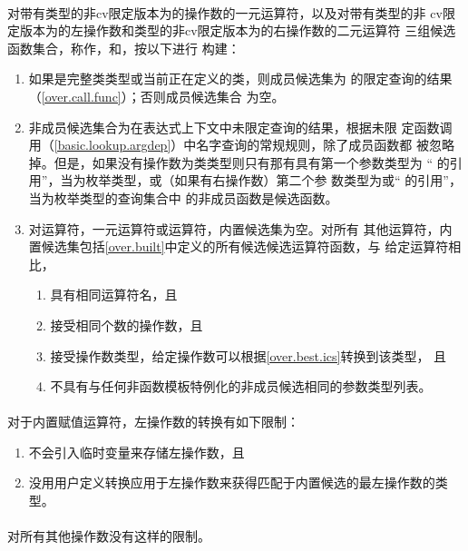 \paragraph{}
对带有类型的非cv限定版本为的操作数的一元运算符，以及对带有类型的非
cv限定版本为的左操作数和类型的非cv限定版本为的右操作数的二元运算符
三组候选函数集合，称作，和，按以下进行
构建：
\begin{enumerate}
  \item{如果是完整类类型或当前正在定义的类，则成员候选集为
    的限定查询的结果（\ref{over.call.func}）；否则成员候选集合
    为空。}
  \item{非成员候选集合为在表达式上下文中未限定查询的结果，根据未限
    定函数调用（\ref{basic.lookup.argdep}）中名字查询的常规规则，除了成员函数都
    被忽略掉。但是，如果没有操作数为类类型则只有那有具有第一个参数类型为
    `` 的引用''，当为枚举类型，或（如果有右操作数）第二个参
    数类型为或`` 的引用''，当为枚举类型的查询集合中
    的非成员函数是候选函数。}
  \item{对运算符\tm{,}，一元运算符\tm{\&}或运算符\tm{->}，内置候选集为空。对所有
    其他运算符，内置候选集包括\ref{over.built}中定义的所有候选候选运算符函数，与
    给定运算符相比，
    \begin{enumerate}
      \item{具有相同运算符名，且}
      \item{接受相同个数的操作数，且}
      \item{接受操作数类型，给定操作数可以根据\ref{over.best.ics}转换到该类型，
        且}
      \item{不具有与任何非函数模板特例化的非成员候选相同的参数类型列表。}
    \end{enumerate}}
\end{enumerate}

\paragraph{}
对于内置赋值运算符，左操作数的转换有如下限制：
\begin{enumerate}
  \item{不会引入临时变量来存储左操作数，且}
  \item{没用用户定义转换应用于左操作数来获得匹配于内置候选的最左操作数的类型。}
\end{enumerate}

\paragraph{}
对所有其他操作数没有这样的限制。

